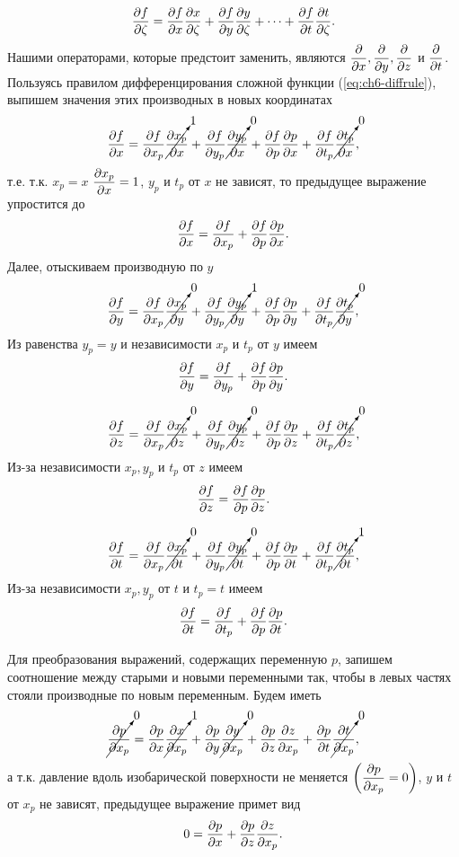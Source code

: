     \begin{equation}
        \label{eq:ch6-diffrule}
        \pd{f}{\zeta}=\pd{f}{x}\pd{x}{\zeta}+\pd{f}{y}\pd{y}{\zeta}+\cdots+\pd{f}{t}\pd{t}{\zeta}.
    \end{equation}
    Нашими операторами, которые предстоит заменить, являются $\pd{}{x},\pd{}{y},\pd{}{z}$ и $\pd{}{t}$. Пользуясь правилом дифференцирования сложной функции (\ref{eq:ch6-diffrule}), выпишем значения этих производных в новых координатах
    \[
    \pd{f}{x}=\pd{f}{x_p}\cancelto{1}{\pd{x_p}{x}}+\pd{f}{y_p}\cancelto{0}{\pd{y_p}{x}}+\pd{f}{p}\pd{p}{x}+\pd{f}{t_p}\cancelto{0}{\pd{t_p}{x}},
    \]
    т.е. т.к. $x_p=x$ $\pd{x_p}{x}=1$, $y_p$ и $t_p$ от $x$ не зависят, то предыдущее выражение упростится до
    \begin{equation}
        \label{eq:fx2p}
        \pd{f}{x}=\pd{f}{x_p}+\pd{f}{p}\pd{p}{x}.
    \end{equation}
    Далее, отыскиваем производную по $y$
    \[
    \pd{f}{y}=\pd{f}{x_p}\cancelto{0}{\pd{x_p}{y}}+\pd{f}{y_p}\cancelto{1}{\pd{y_p}{y}}+\pd{f}{p}\pd{p}{y}+\pd{f}{t_p}\cancelto{0}{\pd{t_p}{y}},
    \]
    Из равенства $y_p=y$ и независимости $x_p$ и $t_p$ от $y$ имеем
    \begin{equation}
        \label{eq:fy2p}
        \pd{f}{y}=\pd{f}{y_p}+\pd{f}{p}\pd{p}{y}.
    \end{equation}

    \[
    \pd{f}{z}=\pd{f}{x_p}\cancelto{0}{\pd{x_p}{z}}+\pd{f}{y_p}\cancelto{0}{\pd{y_p}{z}}+\pd{f}{p}\pd{p}{z}+\pd{f}{t_p}\cancelto{0}{\pd{t_p}{z}},
    \]
    Из-за независимости $x_p,y_p$ и $t_p$ от $z$ имеем
    \begin{equation}
        \label{eq:fz2p}
        \pd{f}{z}=\pd{f}{p}\pd{p}{z}.
    \end{equation}

    \[
    \pd{f}{t}=\pd{f}{x_p}\cancelto{0}{\pd{x_p}{t}}+\pd{f}{y_p}\cancelto{0}{\pd{y_p}{t}}+\pd{f}{p}\pd{p}{t}+\pd{f}{t_p}\cancelto{1}{\pd{t_p}{t}},
    \]
    Из-за независимости $x_p,y_p$ от $t$ и $t_p=t$ имеем
    \begin{equation}
        \label{eq:ft2p}
        \pd{f}{t}=\pd{f}{t_p}+\pd{f}{p}\pd{p}{t}.
    \end{equation}

    Для преобразования выражений, содержащих переменную $p$, запишем соотношение между старыми и новыми переменными так, чтобы в левых частях стояли производные по новым переменным. Будем иметь
    \[
    \cancelto{0}{\pd{p}{x_p}}=\pd{p}{x}\cancelto{1}{\pd{x}{x_p}}+\pd{p}{y}\cancelto{0}{\pd{y}{x_p}}+\pd{p}{z}\pd{z}{x_p}+\pd{p}{t}\cancelto{0}{\pd{t}{x_p}},
    \]
    а т.к. давление вдоль изобарической поверхности не меняется $\left(\pd{p}{x_p}=0\right)$, $y$ и $t$ от $x_p$ не зависят, предыдущее выражение примет вид
    \begin{equation}
        \label{eq:ch6-px2p}
        0=\pd{p}{x}+\pd{p}{z}\pd{z}{x_p}.
    \end{equation}

